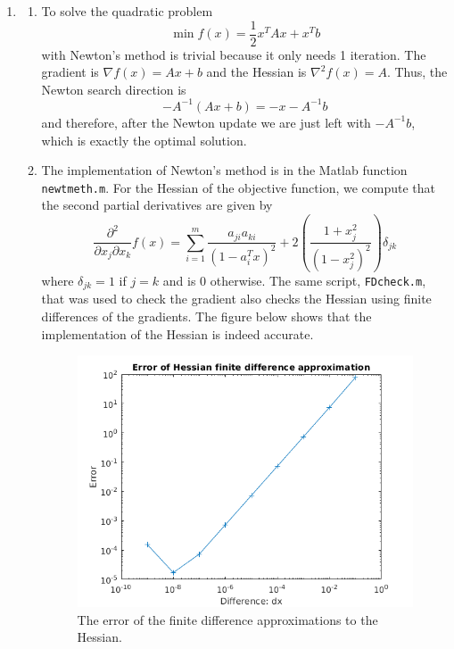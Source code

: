 \documentclass[11pt]{amsart}
\begin{document}
\begin{enumerate}
\vspace{0.5in}


\item 

\begin{enumerate}

\item To solve the quadratic problem
\[
\min f(x) = \frac{1}{2}x^TAx + x^Tb
\]
with Newton's method is trivial because it only needs 1 iteration.  The gradient is $\nabla f(x) = Ax + b$ and the Hessian is $\nabla^2 f(x) = A$.  Thus, the Newton search direction is 
\[
-A^{-1}(Ax + b) = -x - A^{-1}b
\]
and therefore, after the Newton update we are just left with $-A^{-1}b$, which is exactly the optimal solution.




\item The implementation of Newton's method is in the Matlab function \texttt{newtmeth.m}.  For the Hessian of the objective function, we compute that the second partial derivatives are given by
\[
\frac{\partial^2}{\partial x_j \partial x_k} f(x) = \sum_{i=1}^m \frac{a_{ji}a_{ki}}{(1 - a_i^Tx)^2} + 2\left( \frac{1 + x_j^2}{(1 - x_j^2)^2}  \right) \delta_{jk}
\]
where $\delta_{jk} = 1$ if $j = k$ and is 0 otherwise.  The same script, \texttt{FDcheck.m}, that was used to check the gradient also checks the Hessian using finite differences of the gradients.  The figure below shows that the implementation of the Hessian is indeed accurate.

\begin{figure}[H]
\centering
\includegraphics[width=5in]{hess_fd.png}
\caption{The error of the finite difference approximations to the Hessian.}
\label{fig:grad_fd}
\end{figure}


\end{enumerate}
\end{enumerate}
\end{document}

